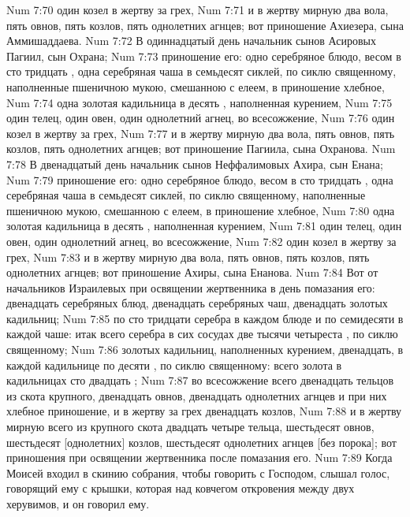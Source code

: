 \vs Num 7:70 один козел в жертву за грех,
\vs Num 7:71 и в жертву мирную два вола, пять овнов, пять козлов, пять однолетних агнцев; вот приношение Ахиезера, сына Аммишаддаева.
\vs Num 7:72 В одиннадцатый день начальник сынов Асировых Пагиил, сын Охрана;
\vs Num 7:73 приношение его: одно серебряное блюдо, весом в сто тридцать , одна серебряная чаша в семьдесят сиклей, по сиклю священному, наполненные пшеничною мукою, смешанною с елеем, в приношение хлебное,
\vs Num 7:74 одна золотая кадильница в десять , наполненная курением,
\vs Num 7:75 один телец, один овен, один однолетний агнец, во всесожжение,
\vs Num 7:76 один козел в жертву за грех,
\vs Num 7:77 и в жертву мирную два вола, пять овнов, пять козлов, пять однолетних агнцев; вот приношение Пагиила, сына Охранова.
\vs Num 7:78 В двенадцатый день начальник сынов Неффалимовых Ахира, сын Енана;
\vs Num 7:79 приношение его: одно серебряное блюдо, весом в сто тридцать , одна серебряная чаша в семьдесят сиклей, по сиклю священному, наполненные пшеничною мукою, смешанною с елеем, в приношение хлебное,
\vs Num 7:80 одна золотая кадильница в десять , наполненная курением,
\vs Num 7:81 один телец, один овен, один однолетний агнец, во всесожжение,
\vs Num 7:82 один козел в жертву за грех,
\vs Num 7:83 и в жертву мирную два вола, пять овнов, пять козлов, пять однолетних агнцев; вот приношение Ахиры, сына Енанова.
\rsbpar\vs Num 7:84 Вот  от начальников Израилевых при освящении жертвенника в день помазания его: двенадцать серебряных блюд, двенадцать серебряных чаш, двенадцать золотых кадильниц;
\vs Num 7:85 по сто тридцати  серебра в каждом блюде и по семидесяти в каждой чаше: итак всего серебра в сих сосудах две тысячи четыреста , по сиклю священному;
\vs Num 7:86 золотых кадильниц, наполненных курением, двенадцать, в каждой кадильнице по десяти , по сиклю священному: всего золота в кадильницах сто двадцать ;
\vs Num 7:87 во всесожжение всего двенадцать тельцов из скота крупного, двенадцать овнов, двенадцать однолетних агнцев и при них хлебное приношение, и в жертву за грех двенадцать козлов,
\vs Num 7:88 и в жертву мирную всего из крупного скота двадцать четыре тельца, шестьдесят овнов, шестьдесят [однолетних] козлов, шестьдесят однолетних агнцев [без порока]; вот приношения при освящении жертвенника после помазания его.
\vs Num 7:89 Когда Моисей входил в скинию собрания, чтобы говорить с Господом, слышал голос, говорящий ему с крышки, которая над ковчегом откровения между двух херувимов, и он говорил ему.
